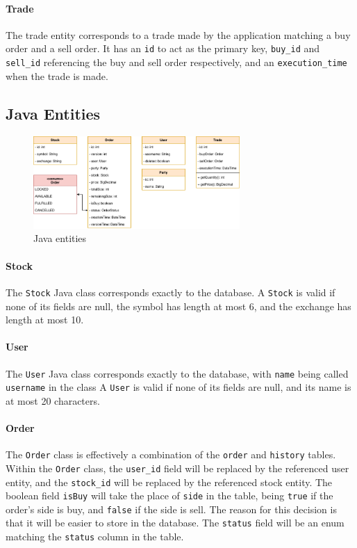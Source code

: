 \documentclass{article}
\begin{document}
\paragraph{Trade} The trade entity corresponds to a trade made by the application matching a buy order and a sell order. It has an \texttt{id} to act as the primary key, \texttt{buy\_id} and \texttt{sell\_id} referencing the buy and sell order respectively, and an \texttt{execution\_time} when the trade is made.

\subsection{Java Entities}

\begin{figure}[h]
    \centering
    \includegraphics[width=0.7\textwidth]{entities.png}
    \caption{Java entities}
\end{figure}

\paragraph{Stock} The \texttt{Stock} Java class corresponds exactly to the database. A \texttt{Stock} is valid if none of its fields are null, the symbol has length at most 6, and the exchange has length at most 10.

\paragraph{User} The \texttt{User} Java class corresponds exactly to the database, with \texttt{name} being called \texttt{username} in the class A \texttt{User} is valid if none of its fields are null, and its name is at most 20 characters.

\paragraph{Order} The \texttt{Order} class is effectively a combination of the \texttt{order} and \texttt{history} tables. Within the \texttt{Order} class, the \texttt{user\_id} field will be replaced by the referenced user entity, and the \texttt{stock\_id} will be replaced by the referenced stock entity. The boolean field \texttt{isBuy} will take the place of \texttt{side} in the table, being \texttt{true} if the order's side is buy, and \texttt{false} if the side is sell. The reason for this decision is that it will be easier to store in the database. The \texttt{status} field will be an enum matching the \texttt{status} column in the table.
\end{document}
